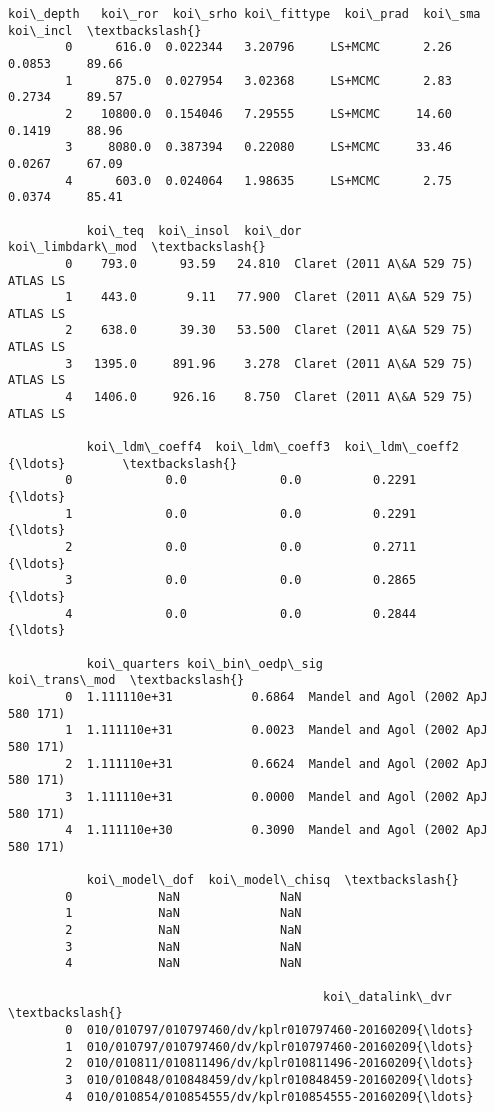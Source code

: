 \documentclass[11pt]{article}
\begin{document}
\begin{Verbatim}[commandchars=\\\{\}]
           koi\_depth   koi\_ror  koi\_srho koi\_fittype  koi\_prad  koi\_sma  koi\_incl  \textbackslash{}
        0      616.0  0.022344   3.20796     LS+MCMC      2.26   0.0853     89.66   
        1      875.0  0.027954   3.02368     LS+MCMC      2.83   0.2734     89.57   
        2    10800.0  0.154046   7.29555     LS+MCMC     14.60   0.1419     88.96   
        3     8080.0  0.387394   0.22080     LS+MCMC     33.46   0.0267     67.09   
        4      603.0  0.024064   1.98635     LS+MCMC      2.75   0.0374     85.41   
        
           koi\_teq  koi\_insol  koi\_dor                   koi\_limbdark\_mod  \textbackslash{}
        0    793.0      93.59   24.810  Claret (2011 A\&A 529 75) ATLAS LS   
        1    443.0       9.11   77.900  Claret (2011 A\&A 529 75) ATLAS LS   
        2    638.0      39.30   53.500  Claret (2011 A\&A 529 75) ATLAS LS   
        3   1395.0     891.96    3.278  Claret (2011 A\&A 529 75) ATLAS LS   
        4   1406.0     926.16    8.750  Claret (2011 A\&A 529 75) ATLAS LS   
        
           koi\_ldm\_coeff4  koi\_ldm\_coeff3  koi\_ldm\_coeff2       {\ldots}        \textbackslash{}
        0             0.0             0.0          0.2291       {\ldots}         
        1             0.0             0.0          0.2291       {\ldots}         
        2             0.0             0.0          0.2711       {\ldots}         
        3             0.0             0.0          0.2865       {\ldots}         
        4             0.0             0.0          0.2844       {\ldots}         
        
           koi\_quarters koi\_bin\_oedp\_sig                       koi\_trans\_mod  \textbackslash{}
        0  1.111110e+31           0.6864  Mandel and Agol (2002 ApJ 580 171)   
        1  1.111110e+31           0.0023  Mandel and Agol (2002 ApJ 580 171)   
        2  1.111110e+31           0.6624  Mandel and Agol (2002 ApJ 580 171)   
        3  1.111110e+31           0.0000  Mandel and Agol (2002 ApJ 580 171)   
        4  1.111110e+30           0.3090  Mandel and Agol (2002 ApJ 580 171)   
        
           koi\_model\_dof  koi\_model\_chisq  \textbackslash{}
        0            NaN              NaN   
        1            NaN              NaN   
        2            NaN              NaN   
        3            NaN              NaN   
        4            NaN              NaN   
        
                                            koi\_datalink\_dvr  \textbackslash{}
        0  010/010797/010797460/dv/kplr010797460-20160209{\ldots}   
        1  010/010797/010797460/dv/kplr010797460-20160209{\ldots}   
        2  010/010811/010811496/dv/kplr010811496-20160209{\ldots}   
        3  010/010848/010848459/dv/kplr010848459-20160209{\ldots}   
        4  010/010854/010854555/dv/kplr010854555-20160209{\ldots}   
        

\end{Verbatim}
\end{document}
